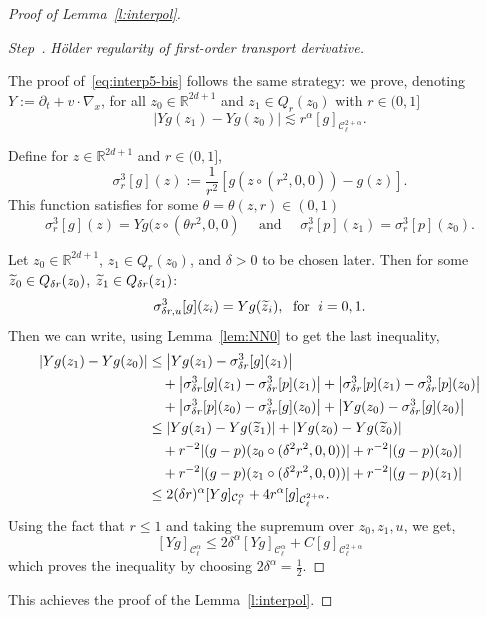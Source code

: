 \documentclass[10pt]{amsart}
\theoremstyle{definition}\newtheorem{defi}[theo]{Definition}\newtheorem{rema}[theo]{Remark}\newtheorem{exam}[theo]{Example}\newtheorem{exem}[theo]{Example}\newtheorem{nota}[theo]{Notation}
\newcommand{\R}{\mathbb{R}}
\newcommand{\cC}{\mathcal{C}}
\newcounter{stepcount}
\newenvironment{step}[1]{\refstepcounter{stepcount}\begin{proof}[Step~\thestepcount]{\emph{#1}}}{\let\qed\relax\end{proof}}
\let\oldtilde\tilde
\renewcommand*{\tilde}[1]{\mathchoice{\widetilde{#1}}{\widetilde{#1}}{\oldtilde{#1}}{\oldtilde{#1}}}
\begin{document}
\begin{proof}[Proof of Lemma~\ref{l:interpol}]
\begin{step}{H\"older regularity of first-order transport derivative.\label{step5}}

The proof of~\eqref{eq:interp5-bis} follows the same strategy: we prove, denoting $Y:=\partial_t + v \cdot \nabla_x$, for all $z_0 \in \R^{2d+1}$ and $z_1 \in Q_r (z_0)$ with $r \in (0,1]$
\[
\left| Y g (z_1) - Y g (z_0) \right| \lesssim r^\alpha [g]_{\cC_\ell^{2+\alpha}}.
\]

Define for $z \in \R^{2d+1}$ and $r \in (0,1]$,
\[
\sigma^3 _{r}[g](z) := \frac{1}{r^2} \left[g(z \circ (r^2,0,0)) - g(z) \right].
\]
This function satisfies for some $\theta = \theta (z,r) \in (0,1)$
\[
\sigma^3_{r} [g] (z) = Y g (z \circ (\theta r^2,0,0) \quad \text{ and } \quad \sigma_{r}^3[p](z_1) =
\sigma_{r}^3[p](z_0).
\]

Let $z_0 \in \R^{2d+1}$, $z_1 \in Q_r (z_0)$, and $\delta >0$ to be chosen later. Then for some $\tilde z_0 \in Q_{\delta r} (z_0)$, $\tilde z_1 \in Q_{\delta r} (z_1)$:
\[
\sigma_{\delta r,u}^3 [g] (z_i) = Y g (\tilde z_i), \;\text{ for }\; i=0,1.
\]
Then we can write, using Lemma~\ref{lem:NN0} to get the last inequality,
\begin{align*}
\left| Y g(z_1) - Y g(z_0) \right| & \le \left| Y g(z_1) - \sigma _{\delta r}^3[g](z_1) \right|\\
&\quad+ \left| \sigma _{\delta r}^3 [g](z_1) - \sigma _{\delta r}^3 [p](z_1) \right| + \left| \sigma_{\delta r}^3 [p](z_1) - \sigma_{\delta r}^3[p](z_0) \right| \\
& \quad +\left| \sigma_{\delta r}^3[p](z_0) - \sigma_{\delta r}^3 [g](z_0) \right| + \left| Y g(z_0) -\sigma_{\delta r}^3 [g](z_0) \right| \\
& \le \left| Y g(z_1) - Y g (\tilde z_1) \right| +
\left| Y g(z_0) - Yg (\tilde z_0) \right| \\
& \quad + r^{-2} |(g-p) (z_0 \circ (\delta^2 r^2,0,0))| + r^{-2} |(g-p) (z_0)| \\
& \quad + r^{-2} |(g-p) (z_1 \circ (\delta^2 r^2,0,0))| + r^{-2} |(g-p) (z_1)| \\
& \le 2 (\delta r)^\alpha [Y g]_{\cC_\ell^\alpha} + 4 r^{\alpha} [g]_{\cC^{2+\alpha}_\ell}.
\end{align*}
Using the fact that $r \le 1$ and taking the supremum over $z_0,z_1, u$, we get,
\[
[Y g]_{\cC_\ell^\alpha} \le 2 \delta ^\alpha [Yg]_{\cC_\ell^\alpha} + C [g]_{\cC^{2+\alpha}_\ell }
\]
which proves the inequality by choosing $2 \delta^\alpha = \frac{1}{2}$.
\end{step}

This achieves the proof of the Lemma~\ref{l:interpol}.
\end{proof}
\end{document}
